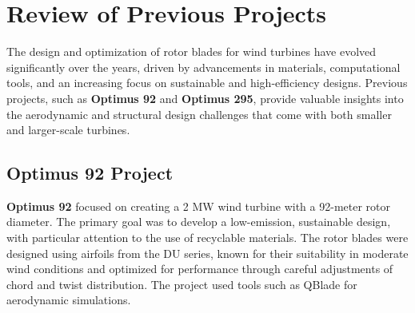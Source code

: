 \chapter{Review of Previous Projects}
The design and optimization of rotor blades for wind turbines have evolved significantly over the years, driven by advancements in materials, computational tools, and an increasing focus on sustainable and high-efficiency designs. Previous projects, such as \textbf{Optimus 92} and \textbf{Optimus 295}, provide valuable insights into the aerodynamic and structural design challenges that come with both smaller and larger-scale turbines.
\section{Optimus 92 Project}
\textbf{Optimus 92} focused on creating a 2 MW wind turbine with a 92-meter rotor diameter. The primary goal was to develop a low-emission, sustainable design, with particular attention to the use of recyclable materials. The rotor blades were designed using airfoils from the DU series, known for their suitability in moderate wind conditions and optimized for performance through careful adjustments of chord and twist distribution. The project used tools such as QBlade for aerodynamic simulations.
